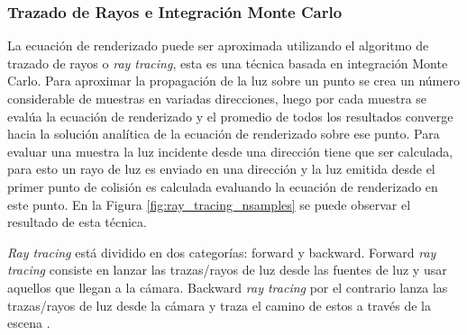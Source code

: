 \subsubsection{Trazado de Rayos e Integración Monte Carlo}
\label{subsec:monte_carlo_raytracing}
La ecuación de renderizado puede ser aproximada utilizando el algoritmo de trazado de rayos o \emph{ray tracing}, esta es una técnica basada en integración Monte Carlo. Para aproximar la propagación de la luz sobre un punto se crea un número considerable de muestras en variadas direcciones, luego por cada muestra se evalúa la ecuación de renderizado y el promedio de todos los resultados converge hacia la solución analítica de la ecuación de renderizado sobre ese punto. Para evaluar una muestra la luz incidente desde una dirección tiene que ser calculada, para esto un rayo de luz es enviado en una dirección y la luz emitida desde el primer punto de colisión es calculada evaluando la ecuación de renderizado en este punto. En la Figura \ref{fig:ray_tracing_nsamples} se puede observar el resultado de esta técnica.

\emph{Ray tracing} está dividido en dos categorías: forward y backward. Forward \emph{ray tracing} consiste en lanzar las trazas/rayos de luz desde las fuentes de luz y usar aquellos que llegan a la cámara. Backward \emph{ray tracing} por el contrario lanza las trazas/rayos de luz desde la cámara y traza el camino de estos a través de la escena \cite{Arvo86backwardray}.

